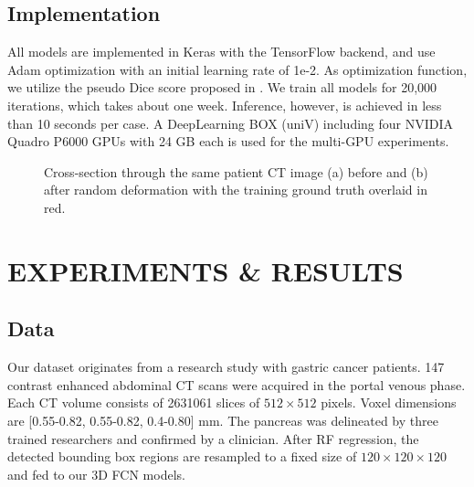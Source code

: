 \documentclass[a4paper]{spie}  %
\begin{document}
\subsection{Implementation} All models are implemented in Keras with the TensorFlow backend, and use Adam optimization \cite{kingma2014adam} with an initial learning rate of 1e-2. As optimization function, we utilize the pseudo Dice score proposed in \cite{milletari2016v}. We train all models for 20,000 iterations, which takes about one week. Inference, however, is achieved in less than 10 seconds per case. A DeepLearning BOX (uniV) including four NVIDIA Quadro P6000 GPUs with 24 GB each is used for the multi-GPU experiments.

\begin{figure}[htb]
  \centering
	\hspace{2em}
    \vspace{1em}
\caption{ Cross-section through the same patient CT image (a) before and (b) after random deformation with the training ground truth overlaid in red. \label{fig:deform}}
\end{figure}
\section{EXPERIMENTS \& RESULTS}
\subsection{Data}
Our dataset originates from a research study with gastric cancer patients. 147 contrast enhanced abdominal CT scans were acquired in the portal venous phase. Each CT volume consists of 2631061 slices of $512\times512$ pixels. Voxel dimensions are [0.55-0.82, 0.55-0.82, 0.4-0.80] mm. The pancreas was delineated by three trained researchers and confirmed by a clinician. After RF regression, the detected bounding box regions are resampled to a fixed size of $120\times120\times120$ and fed to our 3D FCN models.
\end{document}
